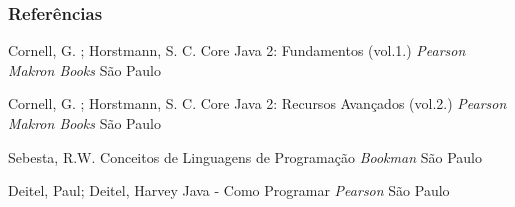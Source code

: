 \documentclass{beamer}
\begin{document}
\begin{frame}
	\frametitle{Referências}
	\footnotesize{
		\begin{thebibliography}{99} %
			 Cornell, G. ; Horstmann, S. C. 
			\newblock Core Java 2: Fundamentos (vol.1.)
			\newblock \emph{Pearson Makron Books} São Paulo
		\end{thebibliography}
		\begin{thebibliography}{99} %
			 Cornell, G. ; Horstmann, S. C. 
			\newblock Core Java 2: Recursos Avançados (vol.2.)
			\newblock \emph{Pearson Makron Books} São Paulo
		\end{thebibliography}
		\begin{thebibliography}{99} %
			 Sebesta, R.W.
			\newblock Conceitos de Linguagens de Programação
			\newblock \emph{Bookman} São Paulo
		\end{thebibliography}
		\begin{thebibliography}{99} %
			 Deitel, Paul; Deitel, Harvey
			\newblock Java - Como Programar
			\newblock \emph{Pearson} São Paulo
		\end{thebibliography}
	}
\end{frame}

\end{document}
